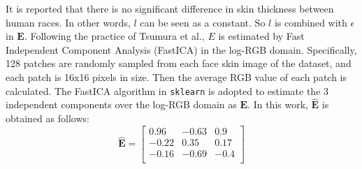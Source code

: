 \begin{spacing}{1.5}
It is reported that there is no significant difference in skin thickness between human races\cite{Whitmore2000}. In other words, $l$ can be seen as a constant. So $l$ is combined with $\epsilon$ in $\mathbf{E}$. Following the practice of Tsumura et al.\cite{tsumura1999independent}, $E$ is estimated by Fast Independent Component Analysis (FastICA)\cite{HYVARINEN2000411} in the log-RGB domain. Specifically, 128 patches are randomly sampled from each face skin image of the dataset, and each patch is 16x16 pixels in size. Then the average RGB value of each patch is calculated. The FastICA algorithm in \texttt{sklearn}\cite{scikit-learn} is adopted to estimate the 3 independent components over the log-RGB domain as $\mathbf{E}$. In this work, $\hat{\mathbf{E}}$ is obtained as follows:
\begin{equation}
    \hat{\mathbf{E}} = \begin{bmatrix}
        0.96  & -0.63 & 0.9  \\
        -0.22 & 0.35  & 0.17 \\
        -0.16 & -0.69 & -0.4 \\
    \end{bmatrix}
\end{equation}


\end{spacing}
